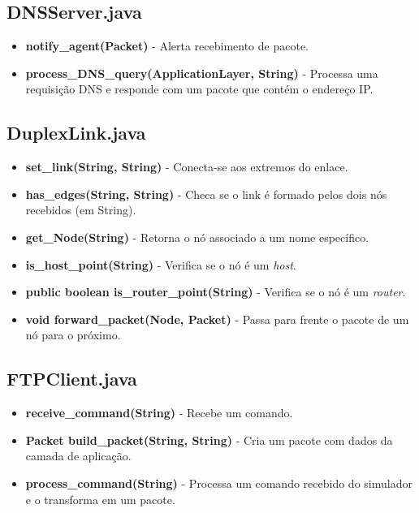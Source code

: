 \documentclass[11pt]{article}
\begin{document}
\subsection{DNSServer.java}

\begin{itemize}
	\item \textbf{notify\_agent(Packet)} - Alerta recebimento de pacote.
	\item \textbf{process\_DNS\_query(ApplicationLayer, String)} - Processa uma requisição DNS e responde com um pacote que contém o endereço IP.
\end{itemize}

\subsection{DuplexLink.java}

\begin{itemize}
	\item \textbf{set\_link(String, String)} - Conecta-se aos extremos do enlace.
	\item \textbf{has\_edges(String, String)} - Checa se o link é formado pelos dois nós recebidos (em String).
	\item \textbf{get\_Node(String)} - Retorna o nó associado a um nome específico.
	\item \textbf{is\_host\_point(String)} - Verifica se o nó é um \textit{host}.
	\item \textbf{public boolean is\_router\_point(String)} - Verifica se o nó é um \textit{router}.
	\item \textbf{void forward\_packet(Node, Packet)} - Passa para frente o pacote de um nó para o próximo.
\end{itemize}

\subsection{FTPClient.java}

\begin{itemize}
	\item \textbf{receive\_command(String)} - Recebe um comando.
	\item \textbf{Packet build\_packet(String, String)} - Cria um pacote com dados da camada de aplicação.
	\item \textbf{process\_command(String)} - Processa um comando recebido do simulador e o transforma em um pacote.
\end{itemize}
\end{document}
